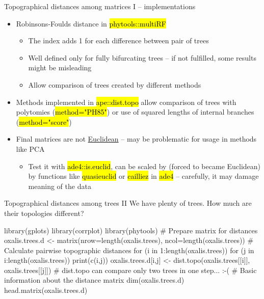 \documentclass[compress, ucs, xelatex, 11pt, xcolor=svgnames,
  hyperref={
    bookmarks=true,
    unicode=true,
    colorlinks=true,
    pdftitle={Molecular data in R},
    plainpages=false,
    pdfauthor={Vojtech Zeisek},
    pdfsubject={Course about phylogeny and evolution in R},
    pdfcreator={XeLaTeX},
    pdfkeywords={R, evolution, phylogeny, molecular data},
    linkcolor=Tomato,
    anchorcolor=SaddleBrown,
    citecolor=Goldenrod,
    filecolor=DarkMagenta,
    menucolor=Sienna,
    urlcolor=DarkTurquoise,
    pdftex},
  url={hyphens, lowtilde} %
  ]{beamer}
\renewcommand{\texttt}[1]{\hl{\ttfamily #1}}
\begin{document}
\begin{frame}{Topographical distances among matrices I -- implementations}
\begin{itemize}
  \item Robinsons-Foulds distance in \texttt{phytools::multiRF}
  \begin{itemize}
    \item The index adds 1 for each difference between pair of trees
    \item Well defined only for fully bifurcating trees -- if not fulfilled, some results might be misleading
    \item Allow comparison of trees created by different methods
  \end{itemize}
  \item Methods implemented in \texttt{ape::dist.topo} allow comparison of trees with polytomies (\texttt{method="PH85"}) or use of squared lengths of internal branches (\texttt{method="score"})
  \item Final matrices are not \href{https://en.wikipedia.org/wiki/Euclidean_distance_matrix}{Euclidean} -- may be problematic for usage in methods like PCA
  \begin{itemize}
    \item Test it with \texttt{ade4::is.euclid}, can be scaled by (forced to became Euclidean) by functions like \texttt{quasieuclid} or \texttt{cailliez} in \texttt{ade4} -- carefully, it may damage meaning of the data
  \end{itemize}
\end{itemize}
\end{frame}

\begin{frame}[fragile]{Topographical distances among trees II}
We have plenty of trees. How much are their topologies different?
  \begin{spluscode}
    library(gplots)
    library(corrplot)
    library(phytools)
    # Prepare matrix for distances
    oxalis.trees.d <- matrix(nrow=length(oxalis.trees),
      ncol=length(oxalis.trees))
    # Calculate pairwise topographic distances
    for (i in 1:length(oxalis.trees)) {
      for (j in i:length(oxalis.trees)) {
        print(c(i,j))
        oxalis.trees.d[i,j] <- dist.topo(oxalis.trees[[i]],
          oxalis.trees[[j]])
      }
    } # dist.topo can compare only two trees in one step... :-(
    # Basic information about the distance matrix
    dim(oxalis.trees.d)
    head.matrix(oxalis.trees.d)
  \end{spluscode}
\end{frame}
\end{document}
